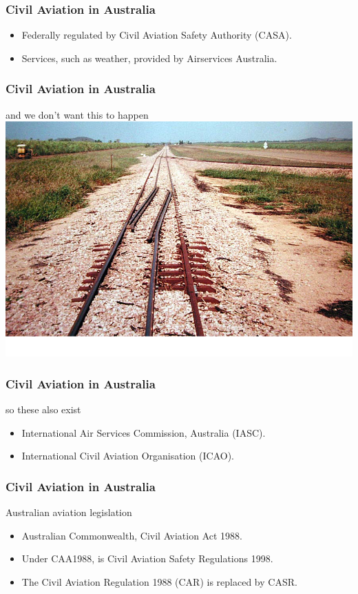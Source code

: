 \begin{frame}
\frametitle{Civil Aviation in Australia}
\begin{itemize}
\item<1-> Federally regulated by Civil Aviation Safety Authority (CASA).
\item<2-> Services, such as weather, provided by Airservices Australia.
\end{itemize}
\end{frame}

\begin{frame}
\frametitle{Civil Aviation in Australia}
\begin{block}{and we don't want this to happen}
\includegraphics[height=0.5\textheight,natwidth=870,natheight=589]{image/railway-gauge.png}
\end{block}
\end{frame}

\begin{frame}
\frametitle{Civil Aviation in Australia}
\begin{block}{so these also exist}
\begin{itemize}
\item<1-> International Air Services Commission, Australia (IASC).
\item<2-> International Civil Aviation Organisation (ICAO).
\end{itemize}
\end{block}
\end{frame}

\begin{frame}
\frametitle{Civil Aviation in Australia}
\begin{block}{Australian aviation legislation}
\begin{itemize}
\item<1-> Australian Commonwealth, Civil Aviation Act 1988.
\item<2-> Under CAA1988, is Civil Aviation Safety Regulations 1998.
\item<3-> The Civil Aviation Regulation 1988 (CAR) is replaced by CASR.
\end{itemize}
\end{block}
\end{frame}

